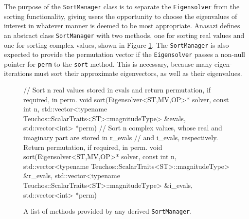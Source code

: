 \documentclass[acmtoms]{acmtrans2m}
\newcommand{\aspace}[1]{\texttt{#1}}
\begin{document}
The purpose of the \aspace{SortManager} class is to separate the \aspace{Eigensolver} from
the sorting functionality, giving users the opportunity to choose the eigenvalues of
interest in whatever manner is deemed to be most appropriate. Anasazi defines an abstract
class \aspace{SortManager} with two methods, one for sorting real values and one for
sorting complex values, shown in Figure \ref{fig:sort}.  The \aspace{SortManager} is also
expected to provide the permutation vector if the \aspace{Eigensolver} passes a non-null
pointer for \verb!perm! to the \aspace{sort} method.  This is necessary, because many
eigen-iterations must sort their approximate eigenvectors, as well as their eigenvalues.

\begin{figure}[htb]
\begin{center}
\begin{boxedverbatim}
// Sort n real values stored in evals and return permutation, if required, in perm.
void sort(Eigensolver<ST,MV,OP>* solver, 
          const int n, 
          std::vector<typename Teuchos::ScalarTraits<ST>::magnitudeType> &evals,
          std::vector<int> *perm) 
// Sort n complex values, whose real and imaginary part are stored in r_evals 
//   and i_evals, respectively. Return permutation, if required, in perm.
void sort(Eigensolver<ST,MV,OP>* solver, 
          const int n, 
          std::vector<typename Teuchos::ScalarTraits<ST>::magnitudeType> &r_evals, 
          std::vector<typename Teuchos::ScalarTraits<ST>::magnitudeType> &i_evals, 
          std::vector<int> *perm)
\end{boxedverbatim}
\end{center}
\caption{A list of methods provided by any derived \aspace{SortManager}.} \label{fig:sort}
\end{figure}
\end{document}
